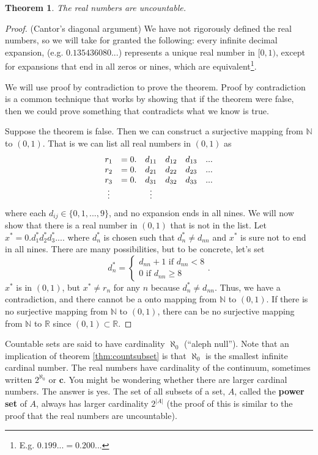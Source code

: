 \documentclass[12pt,reqno]{amsart}
\newtheorem{theorem}{Theorem}[section]
\theoremstyle{definition}
\begin{document}
\begin{theorem}
  The real numbers are uncountable.
\end{theorem}
\begin{proof} (Cantor's diagonal argument)
  We have not rigorously defined the real numbers, so we will take for
  granted the following: every infinite decimal expansion,
  (e.g. $0.135436080...$) represents a unique real number in $[0,1)$,
  except for expansions that end in all zeros or nines, which are
  equivalent\footnote{E.g. $0.199... = 0.200...$}. 
  
  We will use proof by contradiction to prove the theorem. Proof by
  contradiction is a common technique that works by showing that if
  the theorem were false, then we could prove something that
  contradicts what we know is true. 

  Suppose the theorem is false. Then we can construct a surjective
  mapping from $\mathbb{N}$ to $(0,1)$. That is we can list all real
  numbers in $(0,1)$ as
  \begin{align*}
    \begin{array}{c c ccc c}
      r_1 & =  0. & d_{11}& d_{12}& d_{13}& ... \\
      r_2 & =  0. &d_{21}& d_{22}& d_{23}& ... \\
      r_3 & =  0. &d_{31}& d_{32}& d_{33}& ... \\
      \vdots & & \vdots 
    \end{array}
  \end{align*}
  where each $d_{ij} \in \{0,1,...,9\}$, and no expansion ends in all
  nines. We will now show that there is a real number in $(0,1)$ that
  is not in the list. Let $x^* = 0.d^*_1 d^*_2 d^*_3 ...$. where
  $d^*_n$ is chosen such that $d^*_n \neq d_{nn}$ and $x^*$ is sure
  not to end in all nines. There are many possibilities, but to be
  concrete, let's set
  \[ 
  d^*_n
  = \begin{cases} d_{nn} + 1 \text{ if } d_{nn} < 8 \\
    0 \text{ if } d_{nn} \geq 8 
  \end{cases} .
  \]      
  $x^*$ is in $(0,1)$, but $x^* \neq r_n$ for any $n$ because $d^*_n
  \neq d_{nn}$. Thus, we have a contradiction, and there cannot be a
  onto mapping from $\mathbb{N}$ to $(0,1)$.  If there is no
  surjective mapping from $\mathbb{N}$ to $(0,1)$, there can be no
  surjective mapping from $\mathbb{N}$ to $\mathbb{R}$ since $(0,1)
  \subset \mathbb{R}$. 
\end{proof}
Countable sets are said to have cardinality $\aleph_0$ (``aleph
null''). Note that an implication of theorem \ref{thm:countsubset} is
that $\aleph_0$ is the smallest infinite cardinal number. The real
numbers have cardinality of the continuum, sometimes written
$2^{\aleph_0}$ or $\mathbf{c}$. You might be wondering whether there
are larger cardinal numbers. The answer is yes. The set of all subsets
of a set, $A$, called the \textbf{power set} of $A$, always has larger
cardinality $2^{|A|}$ (the proof of this is similar to the proof that
the real numbers are uncountable). 
\end{document}
